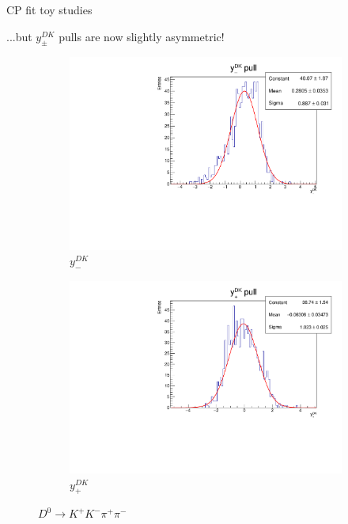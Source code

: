 \documentclass[xcolor={dvipsnames}]{beamer}
\begin{document}
\begin{frame}{CP fit toy studies}
  \begin{center}
    ...but $y_\pm^{DK}$ pulls are now slightly asymmetric!
  \end{center}
  \begin{figure}
    \centering
    \begin{subfigure}{0.5\textwidth}
      \centering
      \includegraphics[width=1.0\textwidth]{Plots/A_ym_dk_pull.pdf}
      \vspace{-0.3cm}
      \caption*{$y_-^{DK}$}
    \end{subfigure}%
    \begin{subfigure}{0.5\textwidth}
      \centering
      \includegraphics[width=1.0\textwidth]{Plots/A_yp_dk_pull.pdf}
      \vspace{-0.3cm}
      \caption*{$y_+^{DK}$}
    \end{subfigure}
    \caption*{$D^0\to K^+K^-\pi^+\pi^-$}
  \end{figure}
\end{frame}
\end{document}
